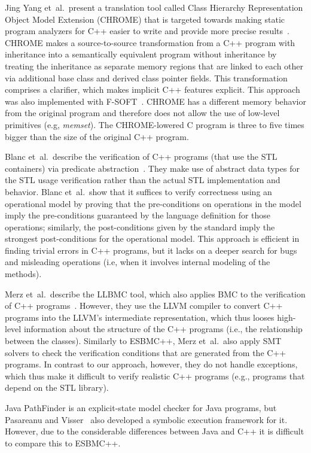 \documentclass[conference]{IEEEtran}
\begin{document}
Jing Yang et~al.\ present a translation tool called Class Hierarchy
Representation Object Model Extension (CHROME) that is targeted towards
making static program analyzers for C++ easier to write and provide
more precise results~\cite{Yang12}. CHROME makes a source-to-source transformation
from a C++ program with inheritance into a semantically equivalent program without
inheritance by treating the inheritance as separate memory regions
that are linked to each other via additional base class and derived class
pointer fields. This transformation comprises a clarifier, which makes
implicit C++ features explicit. This approach was also implemented with 
F-SOFT~\cite{Fsoft}. CHROME has a
different memory behavior from the original program and therefore does not allow
the use of low-level primitives (e.g, \textit{memset}). The CHROME-lowered C program is
three to five times bigger than the size of the original C++ program.

Blanc et~al.\ describe the verification of C++ programs (that use the STL containers)
via predicate abstraction~\cite{Blanc07}. They make use of abstract data types for the STL
usage verification rather than the actual STL implementation and behavior.
Blanc et~al.\ show that it suffices to verify correctness using an operational model
by proving that the pre-conditions on operations in the model imply the pre-conditions
guaranteed by the language definition for those operations; similarly, the post-conditions
given by the standard imply the strongest post-conditions for the operational model.
This approach is efficient in finding trivial errors in C++ programs, but it lacks
on a deeper search for bugs and misleading operations (i.e, when it involves internal
modeling of the methods).

Merz et~al.\ describe the LLBMC tool, which also applies BMC to the verification
of C++ programs~\cite{Florian12}. However, they use the LLVM compiler to convert C++
programs into the LLVM's intermediate representation, which thus looses high-level
information about the structure of the C++ programs (i.e., the relationship between
the classes). Similarly to ESBMC++, Merz et~al.\ also apply SMT solvers to check the verification
conditions that are generated from the C++ programs. In contrast to our approach, however,
they do not handle exceptions, which thus make it difficult to verify realistic C++ programs
(e.g., programs that depend on the STL library).

Java PathFinder is an explicit-state model checker for Java programs, but
Pasareanu and Visser~\cite{Pasareanu04} also developed a symbolic execution 
framework for it. However, due to the considerable differences between 
Java and C++ it is difficult to compare this to ESBMC++.
\end{document}
